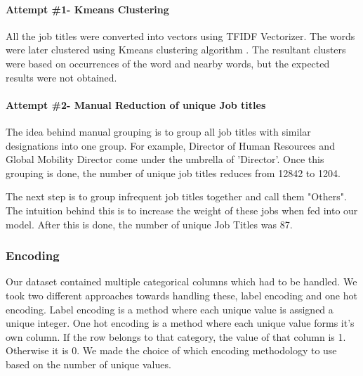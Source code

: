 \documentclass[conference]{IEEEtran}
\begin{document}
\paragraph{\textbf{Attempt \#1- Kmeans Clustering}}
All the job titles were converted into vectors using TFIDF Vectorizer\cite{tfidf}. The words were later clustered using Kmeans clustering algorithm \cite{kmeans}. The resultant clusters were based on occurrences of the word and nearby words, but the expected results were not obtained.

\paragraph{\textbf{Attempt \#2- Manual Reduction of unique Job titles}}
The idea behind manual grouping is to group all job titles with similar designations into one group.
For example, Director of Human Resources and Global Mobility Director come under the umbrella of 'Director'.
Once this grouping is done, the number of unique job titles reduces from 12842 to 1204.

The next step is to group infrequent job titles together and call them "Others". The intuition behind this is to increase the weight of these jobs when fed into our model. After this is done, the number of unique Job Titles was 87.

\subsubsection{\textbf{Encoding}}
Our dataset contained multiple categorical columns which had to be handled. We took two different approaches towards handling these, label encoding and one hot encoding. Label encoding is a method where each unique value is assigned a unique integer. One hot encoding is a method where each unique value forms it's own column. If the row belongs to that category, the value of that column is 1. Otherwise it is 0. We made the choice of which encoding methodology to use based on the number of unique values. 
\end{document}
